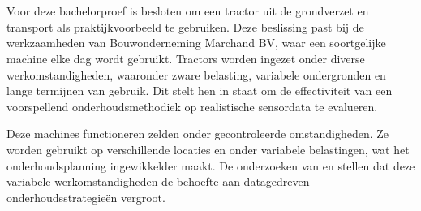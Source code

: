 
\section{}%
\label{sec: De aanleiding voor de gekozen praktijkcase} 

Voor deze bachelorproef is besloten om een tractor uit de grondverzet en transport als praktijkvoorbeeld te gebruiken. Deze beslissing past bij de werkzaamheden van Bouwonderneming Marchand BV, waar een soortgelijke machine elke dag wordt gebruikt. Tractors worden ingezet onder diverse werkomstandigheden, waaronder zware belasting, variabele ondergronden en lange termijnen van gebruik. Dit stelt hen in staat om de effectiviteit van een voorspellend onderhoudsmethodiek op realistische sensordata te evalueren. 


Deze machines functioneren zelden onder gecontroleerde omstandigheden. Ze worden gebruikt op verschillende locaties en onder variabele belastingen, wat het onderhoudsplanning ingewikkelder maakt. De onderzoeken van \textcite{Farwaha2024} en \textcite{Morganti2024} stellen dat deze variabele werkomstandigheden de behoefte aan datagedreven onderhoudsstrategieën vergroot.

